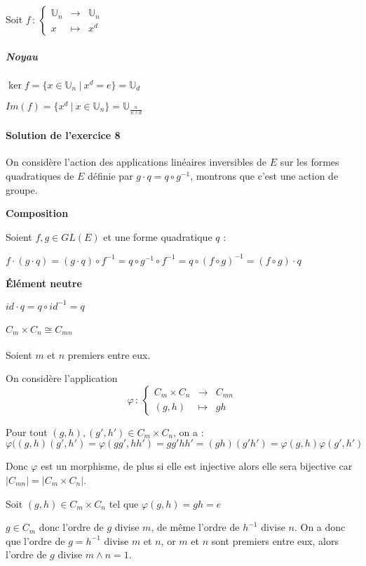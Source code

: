 \documentclass[]{article}
\theoremstyle{remark}
\theoremstyle{definition}
\newcommand{\func}[5]{
#1 \, : \, \left\{ \begin{array}{lcl}
	#2 & \longrightarrow & #3 \\
	#4 & \longmapsto & #5
\end{array}
\right.
}
\newenvironment{proofpart}[1]{
	\noindent
	{\textbf{\boldmath #1}}
}{
	\checkmark
}
\begin{document}
Soit $\func{f}{\mathbb{U}_n}{\mathbb{U}_n}{x}{x^d}$

\subparagraph{Noyau}

$\ker f = \{x \in \mathbb{U}_n ~ | ~ x^d = e \} = \mathbb{U}_d$

$Im(f)=\{x^d ~|~ x \in \mathbb{U}_n\}=\mathbb{U}_{\frac{n}{n \land d}}$

\paragraph{Solution de l'exercice 8}

On considère l'action des applications linéaires inversibles de $E$ sur les formes quadratiques de $E$ définie par $g \cdot q = q \circ g^{-1}$, montrons que c'est une action de groupe.

\begin{proofpart}{Composition}

	Soient $f, g \in GL(E)$ et une forme quadratique $q$ :
	
	$f\cdot(g \cdot q)=(g \cdot q) \circ f^{-1}=q\circ g^{-1}\circ f^{-1}=q \circ (f \circ g)^{-1}=(f \circ g) \cdot q$
\end{proofpart}

\begin{proofpart}{Élément neutre}

	$id \cdot q = q \circ id^{-1} = q$
\end{proofpart}

\paragraph{\boldmath $C_m \times C_n \cong C_{mn}$} Soient $m$ et $n$ premiers entre eux.

On considère l'application
$$\func{\varphi}{C_m \times C_n}{C_{mn}}{(g,h)}{gh}$$

Pour tout $(g, h), (g', h') \in C_m \times C_n$, on a :  $$\varphi((g,h)(g',h')=\varphi(gg',hh')=gg'hh'=(gh)(g'h')=\varphi(g,h)\varphi(g',h')$$

Donc $\varphi$ est un morphisme, de plus si elle est injective alors elle sera bijective car $|C_{mn}| = |C_m \times C_n|$.

Soit $(g,h) \in C_m \times C_n$ tel que $\varphi(g, h) = gh = e$

$g \in C_m$ donc l'ordre de $g$ divise $m$, de même l'ordre de $h^{-1}$ divise $n$. On a donc que l'ordre de $g=h^{-1}$ divise $m$ et $n$, or $m$ et $n$ sont premiers entre eux, alors l'ordre de $g$ divise $m \land n = 1$.
\end{document}
